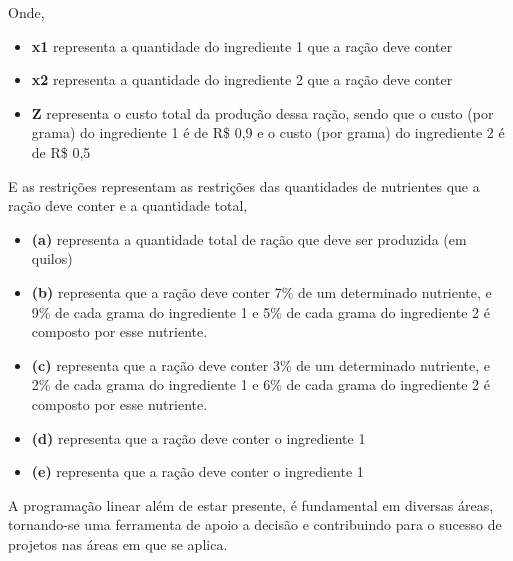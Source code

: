 Onde, 
\begin{itemize}
\item \textbf {x1} representa a quantidade do ingrediente 1 que a ração deve conter
\item \textbf {x2} representa a quantidade do ingrediente 2 que a ração deve conter
\item \textbf {Z} representa o custo total da produção dessa ração, sendo que o custo (por grama) do ingrediente 1 é de R\$ 0,9 e o custo (por grama) do ingrediente 2 é de R\$ 0,5
\end{itemize}

E as restrições representam as restrições das quantidades de nutrientes que a ração deve conter e a quantidade total,
\begin{itemize}
\item \textbf {(a)} representa a quantidade total de ração que deve ser produzida (em quilos)
\item \textbf {(b)} representa que a ração deve conter 7\% de um determinado nutriente, e 9\% de cada grama do ingrediente 1 e 5\% de cada grama do ingrediente 2 é composto por esse nutriente. 
\item \textbf {(c)} representa que a ração deve conter 3\% de um determinado nutriente, e 2\% de cada grama do ingrediente 1 e 6\% de cada grama do ingrediente 2 é composto por esse nutriente.
\item \textbf {(d)} representa que a ração deve conter o ingrediente 1
\item \textbf {(e)} representa que a ração deve conter o ingrediente 1
\end{itemize}

A programação linear além de estar presente, é fundamental em diversas áreas, tornando-se uma ferramenta de apoio a decisão e contribuindo para o sucesso de projetos nas áreas em que se aplica.


